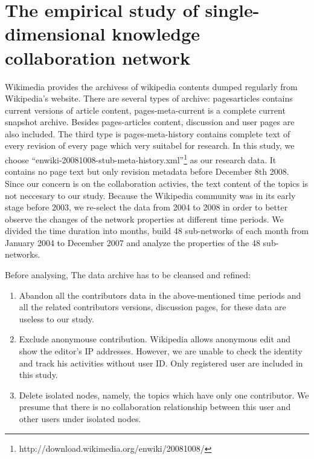 \documentclass{elsarticle}
\begin{document}
\section{The empirical study of single-dimensional  knowledge collaboration network}
\label{sec:empir-study-single}
Wikimedia provides the archivess of  wikipedia contents dumped
regularly from
Wikipedia's website.  There are several types of archive: 
pages\nobreakdash{-}articles contains current versions of article content,
pages-meta-current is  a   complete current snapshot archive. Besides pages-articles
content, discussion and user pages are also included.  The third type
is pages-meta-history contains complete text of every revision of
every page which very suitabel  for research.
In this study, we choose
“enwiki-20081008-stub-meta-history.xml”\footnote{http://download.wikimedia.org/enwiki/20081008/} as our research
data. It contains no page text but only revision metadata before
December 8th 2008. Since our concern is on the collaboration activies,
the text content of the topics is not neccesary to our study. Because
the Wikipedia community was in its early stage
 before 2003, we re-select the data from 2004 to 2008 in order to
better observe the changes of the network  properties at different time periods. We divided the time duration into months, build 48 sub-networks of each month from January 2004 to December 2007 and analyze the properties of the 48 sub-networks.

Before analysing, The data archive has to be cleansed and refined:
\begin{enumerate}
\item Abandon all the contributors data in the above-mentioned time
  periods and all the related contributors versions, discussion pages, 
  for these data are useless to our study.
\item Exclude anonymouse contribution. Wikipedia allows anonymous edit
  and show the editor's IP addresses. However, we are unable to check
  the identity and track his activities without user ID. Only
  registered user are included in this study.
\item Delete isolated nodes, namely, the topics which have only one
  contributor. We presume that there is no collaboration relationship
  between this user and other users under isolated nodes.

\end{enumerate}
 
\end{document}
